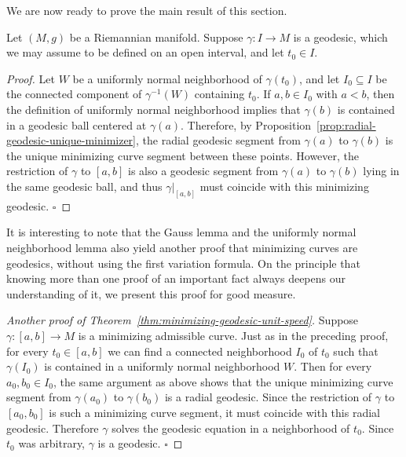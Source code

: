 We are now ready to prove the main result of this section.


\begin{theorem}
\label{thm:locally-minimizing-geodesics}

Let $(M, g)$ be a Riemannian manifold. Suppose $\gamma: I \to M$ is a geodesic, which we may assume to be defined on an open interval, and let $t_0 \in I$.
\end{theorem}

\begin{proof}
Let $W$ be a uniformly normal neighborhood of $\gamma(t_0)$, and let $I_0 \subseteq I$ be the connected component of $\gamma^{-1}(W)$ containing $t_0$. If $a, b \in I_0$ with $a < b$, then the definition of uniformly normal neighborhood implies that $\gamma(b)$ is contained in a geodesic ball centered at $\gamma(a)$. Therefore, by Proposition~\ref{prop:radial-geodesic-unique-minimizer}, the radial geodesic segment from $\gamma(a)$ to $\gamma(b)$ is the unique minimizing curve segment between these points. However, the restriction of $\gamma$ to $[a,b]$ is also a geodesic segment from $\gamma(a)$ to $\gamma(b)$ lying in the same geodesic ball, and thus $\gamma|_{[a,b]}$ must coincide with this minimizing geodesic. $\square$
\end{proof}

It is interesting to note that the Gauss lemma and the uniformly normal neighborhood lemma also yield another proof that minimizing curves are geodesics, without using the first variation formula. On the principle that knowing more than one proof of an important fact always deepens our understanding of it, we present this proof for good measure.

\begin{proof}[Another proof of Theorem~\ref{thm:minimizing-geodesic-unit-speed}]
Suppose $\gamma: [a,b] \to M$ is a minimizing admissible curve. Just as in the preceding proof, for every $t_0 \in [a,b]$ we can find a connected neighborhood $I_0$ of $t_0$ such that $\gamma(I_0)$ is contained in a uniformly normal neighborhood $W$. Then for every $a_0, b_0 \in I_0$, the same argument as above shows that the unique minimizing curve segment from $\gamma(a_0)$ to $\gamma(b_0)$ is a radial geodesic. Since the restriction of $\gamma$ to $[a_0, b_0]$ is such a minimizing curve segment, it must coincide with this radial geodesic. Therefore $\gamma$ solves the geodesic equation in a neighborhood of $t_0$. Since $t_0$ was arbitrary, $\gamma$ is a geodesic. $\square$
\end{proof}

